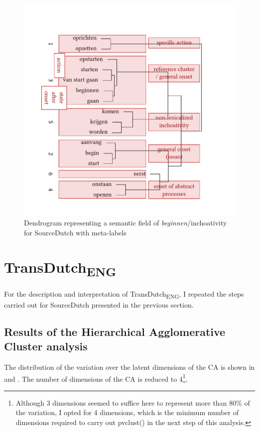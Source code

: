 \begin{figure}
\includegraphics[width=\textwidth]{figures/tree62.pdf}
\caption{\label{fig:4:61b}  Dendrogram representing a semantic field of \textit{beginnen}/inchoativity for SourceDutch with meta-labels}
\end{figure}

\section{TransDutch\textsubscript{ENG}}
\label{sec:4.3}  
For the description and interpretation of TransDutch\textsubscript{ENG}, I repeated the steps carried out for SourceDutch presented in the previous section.

\subsection{Results of the Hierarchical Agglomerative Cluster analysis}
\label{sec:4.3.1}  
The distribution of the variation over the latent dimensions of the CA is shown in  and . The number of dimensions of the CA is reduced to 4\footnote{Although 3 dimensions seemed to suffice here to represent more than 80\% of the variation, I opted for 4 dimensions, which is the minimum number of dimensions required to carry out pvclust() in the next step of this analysis.}.


